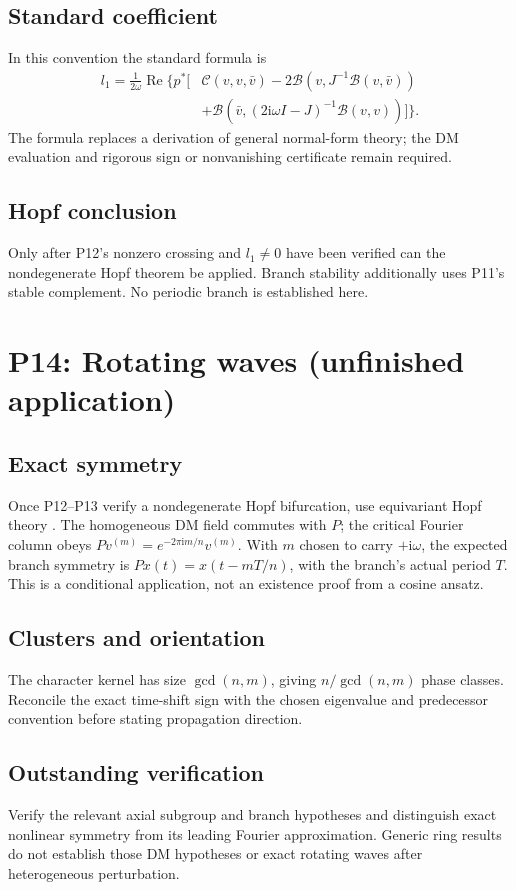 \documentclass[11pt]{article}
\newcommand{\ii}{\mathrm{i}}
\DeclareMathOperator{\Ree}{Re}
\theoremstyle{definition}
\theoremstyle{remark}
\begin{document}
\subsection{Standard coefficient}\label{slot:P13-3}
In this convention the standard formula is \cite{KuznetsovHopf2006}
\begin{align*}
 l_1=\frac1{2\omega}\Ree\bigl\{p^*\bigl[
 &\mathcal C(v,v,\bar v)-2\mathcal B(v,J^{-1}\mathcal B(v,\bar v))\\
 &+\mathcal B(\bar v,(2\ii\omega I-J)^{-1}\mathcal B(v,v))\bigr]\bigr\}.
\end{align*}
The formula replaces a derivation of general normal-form theory; the DM
evaluation and rigorous sign or nonvanishing certificate remain required.
\subsection{Hopf conclusion}\label{slot:P13-4}
Only after P12's nonzero crossing and $l_1\ne0$ have been verified can
the nondegenerate Hopf theorem be applied. Branch stability additionally
uses P11's stable complement. No periodic branch is established here.


\section{P14: Rotating waves (unfinished application)}
\label{sec:P14}
\subsection{Exact symmetry}\label{slot:P14-1}
Once P12--P13 verify a nondegenerate Hopf bifurcation, use equivariant
Hopf theory \cite[Theorem~3.7]{Stewart2024}. The homogeneous DM field
commutes with $P$; the critical Fourier column obeys
$Pv^{(m)}=e^{-2\pi\ii m/n}v^{(m)}$. With $m$ chosen to carry
$+\ii\omega$, the expected branch symmetry is
$Px(t)=x(t-mT/n)$, with the branch's actual period $T$.
This is a conditional application, not an existence proof from a cosine ansatz.
\subsection{Clusters and orientation}\label{slot:P14-2}
The character kernel has size $\gcd(n,m)$, giving $n/\gcd(n,m)$
phase classes. Reconcile the exact time-shift sign with the chosen
eigenvalue and predecessor convention before stating propagation direction.
\subsection{Outstanding verification}\label{slot:P14-3}
Verify the relevant axial subgroup and branch hypotheses and distinguish
exact nonlinear symmetry from its leading Fourier approximation.
Generic ring results do not establish those DM hypotheses or exact
rotating waves after heterogeneous perturbation.
\end{document}
